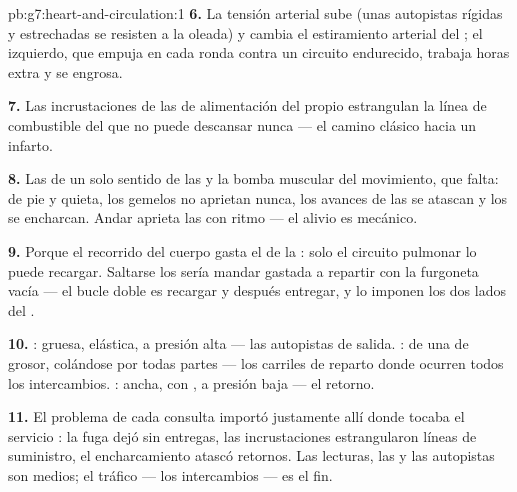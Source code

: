 \begin{solution}{pb:g7:heart-and-circulation:1}
\textbf{6.} La tensión arterial sube (unas autopistas rígidas y
estrechadas se resisten a la oleada) y cambia el estiramiento arterial
del ; el  izquierdo, que empuja en cada ronda contra un
circuito endurecido, trabaja horas extra y se engrosa.

\textbf{7.} Las incrustaciones de las  de alimentación del
propio  estrangulan la línea de combustible del  que no
puede descansar nunca --- el camino clásico hacia un infarto.

\textbf{8.} Las  de un solo sentido de las  y la bomba
muscular del movimiento, que falta: de pie y quieta, los gemelos no
aprietan nunca, los avances de las  se atascan y los 
se encharcan. Andar aprieta las  con ritmo --- el alivio es
mecánico.

\textbf{9.} Porque el recorrido del cuerpo gasta el  de la
: solo el circuito pulmonar lo puede recargar. Saltarse los
 sería mandar  gastada a repartir con la furgoneta vacía
--- el bucle doble es recargar y después entregar, y lo imponen los dos
lados del .

\textbf{10.} : gruesa, elástica, a presión alta --- las
autopistas de salida. : de una  de grosor, colándose por
todas partes --- los carriles de reparto donde ocurren todos los
intercambios. : ancha, con , a presión baja --- el retorno.

\textbf{11.} El problema de cada consulta importó justamente allí donde
tocaba el servicio : la fuga dejó sin entregas, las
incrustaciones estrangularon líneas de suministro, el encharcamiento
atascó retornos. Las lecturas, las  y las autopistas son
medios; el tráfico  --- los intercambios --- es el fin.


\end{solution}
